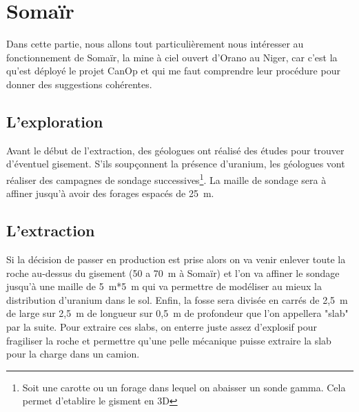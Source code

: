 

\section{Somaïr}
Dans cette partie, nous allons tout particulièrement nous intéresser au fonctionnement de Somaïr, la mine à ciel ouvert d'Orano au Niger, car c'est la qu'est déployé le projet CanOp et qui me faut comprendre leur procédure pour donner des suggestions cohérentes.
\subsection{L'exploration}
Avant le début de l'extraction, des géologues ont réalisé des études pour trouver d'éventuel gisement. S'ils soupçonnent la présence d'uranium, les géologues vont réaliser des campagnes de sondage successives\footnote{Soit une carotte ou un forage dans lequel on abaisser un 
sonde gamma. Cela permet d'etablire le gisment en 3D}. La maille de sondage sera à affiner jusqu'à avoir des forages espacés de 25~m. 
\subsection{L'extraction}
\label{ssec_extraction}
Si la décision de passer en production est prise alors on va venir enlever toute la roche au-dessus du gisement (50 a 70~m à Somaïr) et l’on va affiner le sondage jusqu'à une maille de 5~m*5~m qui va permettre de modéliser au mieux la distribution d'uranium dans le sol. Enfin, la fosse sera divisée en carrés de 2,5~m de large sur 2,5~m de longueur sur 0,5~m de profondeur que l'on appellera "slab" par la suite. Pour extraire ces slabs, on enterre juste assez d'explosif pour fragiliser la roche et permettre qu'une pelle mécanique puisse extraire la slab pour la charge dans un camion.
